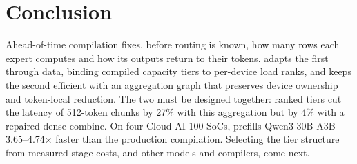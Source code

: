\section{Conclusion}
\label{sec:conclusion}

Ahead-of-time compilation fixes, before routing is known, how many rows each expert computes and how its outputs return
to their tokens. \sys adapts the first through data, binding compiled capacity tiers to per-device load ranks, and keeps the
second efficient with an aggregation graph that preserves device ownership and token-local reduction. The two must be
designed together: ranked tiers cut the latency of 512-token chunks by 27\% with this aggregation but by 4\% with a
repaired dense combine. On four Cloud AI 100 SoCs, \sys prefills Qwen3-30B-A3B 3.65--4.74$\times$ faster than the production
compilation. Selecting the tier structure from measured stage costs, and other models and compilers, come next.
